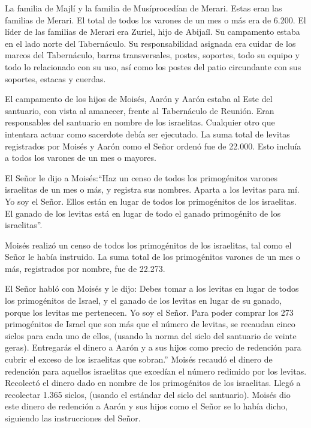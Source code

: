  La familia de Majlí y la familia de Musíprocedían de
Merari. Estas eran las familias de Merari.  El total de
todos los varones de un mes o más era de 6.200.  El líder
de las familias de Merari era Zuriel, hijo de Abijaíl. Su campamento
estaba en el lado norte del Tabernáculo.  Su
responsabilidad asignada era cuidar de los marcos del Tabernáculo,
barras transversales, postes, soportes, todo su equipo y todo lo
relacionado con su uso,  así como los postes del patio
circundante con sus soportes, estacas y cuerdas.

 El campamento de los hijos de Moisés, Aarón y Aarón estaba
al Este del santuario, con vista al amanecer, frente al Tabernáculo de
Reunión. Eran responsables del santuario en nombre de los israelitas.
Cualquier otro que intentara actuar como sacerdote debía ser ejecutado.
 La suma total de levitas registrados por Moisés y Aarón
como el Señor ordenó fue de 22.000. Esto incluía a todos los varones de
un mes o mayores.

 El Señor le dijo a Moisés:``Haz un censo de todos los
primogénitos varones israelitas de un mes o más, y registra sus nombres.
 Aparta a los levitas para mí. Yo soy el Señor. Ellos están
en lugar de todos los primogénitos de los israelitas. El ganado de los
levitas está en lugar de todo el ganado primogénito de los israelitas''.

 Moisés realizó un censo de todos los primogénitos de los
israelitas, tal como el Señor le había instruido.  La suma
total de los primogénitos varones de un mes o más, registrados por
nombre, fue de 22.273.

 El Señor habló con Moisés y le dijo:  Debes
tomar a los levitas en lugar de todos los primogénitos de Israel, y el
ganado de los levitas en lugar de su ganado, porque los levitas me
pertenecen. Yo soy el Señor.  Para poder comprar los 273
primogénitos de Israel que son más que el número de levitas,
 se recaudan cinco siclos para cada uno de ellos, (usando
la norma del siclo del santuario de veinte geras). 
Entregarás el dinero a Aarón y a sus hijos como precio de redención para
cubrir el exceso de los israelitas que sobran.''  Moisés
recaudó el dinero de redención para aquellos israelitas que excedían el
número redimido por los levitas.  Recolectó el dinero dado
en nombre de los primogénitos de los israelitas. Llegó a recolectar
1.365 siclos, (usando el estándar del siclo del santuario).
 Moisés dio este dinero de redención a Aarón y sus hijos
como el Señor se lo había dicho, siguiendo las instrucciones del Señor.

